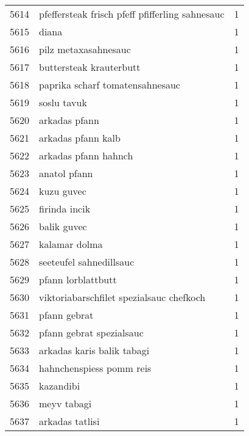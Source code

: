 \begin{tabular}{llr}
5614 &    pfeffersteak frisch pfeff pfifferling sahnesauc &      1 \\
5615 &                                              diana &      1 \\
5616 &                               pilz metaxasahnesauc &      1 \\
5617 &                            buttersteak krauterbutt &      1 \\
5618 &                    paprika scharf tomatensahnesauc &      1 \\
5619 &                                        soslu tavuk &      1 \\
5620 &                                      arkadas pfann &      1 \\
5621 &                                 arkadas pfann kalb &      1 \\
5622 &                               arkadas pfann hahnch &      1 \\
5623 &                                       anatol pfann &      1 \\
5624 &                                         kuzu guvec &      1 \\
5625 &                                      firinda incik &      1 \\
5626 &                                        balik guvec &      1 \\
5627 &                                      kalamar dolma &      1 \\
5628 &                            seeteufel sahnedillsauc &      1 \\
5629 &                                 pfann lorblattbutt &      1 \\
5630 &           viktoriabarschfilet spezialsauc chefkoch &      1 \\
5631 &                                       pfann gebrat &      1 \\
5632 &                           pfann gebrat spezialsauc &      1 \\
5633 &                         arkadas karis balik tabagi &      1 \\
5634 &                           hahnchenspiess pomm reis &      1 \\
5635 &                                          kazandibi &      1 \\
5636 &                                        meyv tabagi &      1 \\
5637 &                                    arkadas tatlisi &      1 \\

\end{tabular}
